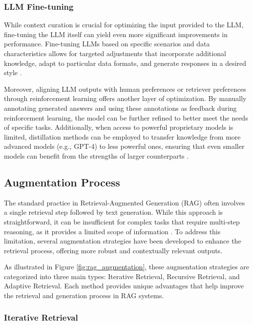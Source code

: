 \subsubsection{LLM Fine-tuning}

While context curation is crucial for optimizing the input provided to the LLM, fine-tuning the LLM itself can yield even more significant improvements in performance. Fine-tuning LLMs based on specific scenarios and data characteristics allows for targeted adjustments that incorporate additional knowledge, adapt to particular data formats, and generate responses in a desired style \cite{du2022retrieval}.

Moreover, aligning LLM outputs with human preferences or retriever preferences through reinforcement learning offers another layer of optimization. By manually annotating generated answers and using these annotations as feedback during reinforcement learning, the model can be further refined to better meet the needs of specific tasks. Additionally, when access to powerful proprietary models is limited, distillation methods can be employed to transfer knowledge from more advanced models (e.g., GPT-4) to less powerful ones, ensuring that even smaller models can benefit from the strengths of larger counterparts \cite{shi2023dual}.

\subsection{Augmentation Process}

The standard practice in Retrieval-Augmented Generation (RAG) often involves a single retrieval step followed by text generation. While this approach is straightforward, it can be insufficient for complex tasks that require multi-step reasoning, as it provides a limited scope of information \cite{yoran2023making}. To address this limitation, several augmentation strategies have been developed to enhance the retrieval process, offering more robust and contextually relevant outputs.

As illustrated in Figure \ref{fig:rag_augmentation}, these augmentation strategies are categorized into three main types: Iterative Retrieval, Recursive Retrieval, and Adaptive Retrieval. Each method provides unique advantages that help improve the retrieval and generation process in RAG systems.

\subsubsection{Iterative Retrieval}

